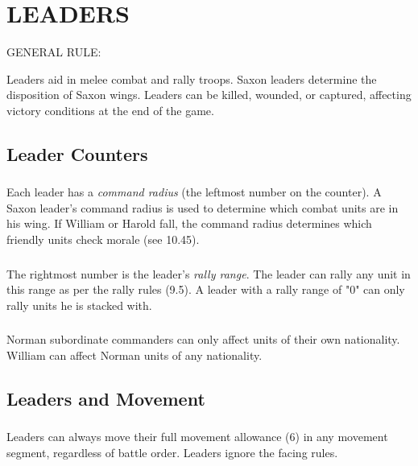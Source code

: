 \section{LEADERS}

\hfill

GENERAL RULE:

Leaders aid in melee combat and rally troops. Saxon leaders determine the disposition of Saxon wings. Leaders can be killed, wounded, or captured, affecting victory conditions at the end of the game.

\subsection{Leader Counters}

\subsubsection[Command Radius]{} Each leader has a \textit{command radius} (the leftmost number on the counter). A Saxon leader's command radius is used to determine which combat units are in his wing. If William or Harold fall, the command radius determines which friendly units check morale (see 10.45).

\subsubsection[Rally Range]{} The rightmost number is the leader's \textit{rally range}. The leader can rally any unit in this range as per the rally rules (9.5). A leader with a rally range of "0" can only rally units he is stacked with.

\subsubsection[Subordinate]{} Norman subordinate commanders can only affect units of their own nationality. William can affect Norman units of any nationality.

\subsection{Leaders and Movement}

\subsubsection[Movement]{} Leaders can always move their full movement allowance (6) in any movement segment, regardless of battle order. Leaders ignore the facing rules.

